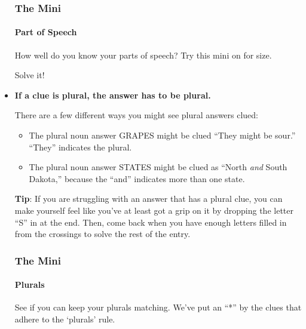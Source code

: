 \begin{itemize}
  \hypertarget{the-mini-3}{%
  \subsubsection{The Mini}\label{the-mini-3}}

  \href{https://www.nytimes.com/crosswords/game/special/parts-of-speech}{}

  \hypertarget{part-of-speech}{%
  \paragraph{Part of Speech}\label{part-of-speech}}

  How well do you know your parts of speech? Try this mini on for size.

  Solve it!
\item
  \textbf{If a clue is plural, the answer has to be plural.}~

  There are a few different ways you might see plural answers clued:

  \begin{itemize}
  \tightlist
  \item
    The plural noun answer GRAPES might be clued ``They might be sour.''
    ``They'' indicates the plural.
  \item
    The plural noun answer STATES might be clued as ``North \emph{and}
    South Dakota,'' because the ``and'' indicates more than one state.
  \end{itemize}

  \textbf{Tip}: If you are struggling with an answer that has a plural
  clue, you can make yourself feel like you've at least got a grip on it
  by dropping the letter ``S'' in at the end. Then, come back when you
  have enough letters filled in from the crossings to solve the rest of
  the entry.

  \hypertarget{the-mini-4}{%
  \subsubsection{The Mini}\label{the-mini-4}}

  \href{https://www.nytimes.com/crosswords/game/special/plurals}{}

  \hypertarget{plurals}{%
  \paragraph{Plurals}\label{plurals}}

  See if you can keep your plurals matching. We've put an ``*'' by the
  clues that adhere to the `plurals' rule.


\end{itemize}
